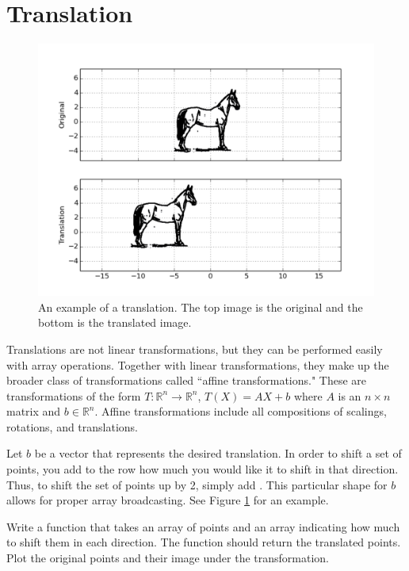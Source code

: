 \section*{Translation}

\begin{figure}
\centering
\includegraphics[width=\textwidth]{shift.pdf}
\caption{
An example of a translation.
The top image is the original and the bottom is the translated image.}
\label{basis:translation}
\end{figure}

Translations are not linear transformations, but they can be performed easily with array operations.
Together with linear transformations, they make up the broader class of transformations called
``affine transformations."
These are transformations of the form $T: \mathbb{R}^n \to \mathbb{R}^n$, $T(X) = AX + b$ where $A$ is
an $n\times n$ matrix and $b \in \mathbb{R}^n$.
Affine transformations include all compositions of scalings, rotations, and translations.


Let $b$ be a vector that represents the desired translation.
In order to shift a set of points, you add to the row how much you would like it to shift
in that direction. Thus, to shift the set of points up by 2, simply add .
This particular shape for $b$ allows for proper array broadcasting.
See Figure \ref{basis:translation} for an example.

\begin{problem}
Write a function that takes an array of points and an array indicating how much to shift
them in each direction. The function should return the translated points.
Plot the original points and their image under the transformation.
\end{problem}

